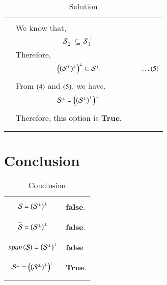 \documentclass[journal,12pt]{IEEEtran}
\begin{document}
\begin{longtable}{|c|l|}
	&\\
	&We know that,\\
	&$\qquad\qquad\qquad\mathcal{S}_{2}^{\perp}\subseteq\mathcal{S}_{1}^{\perp}$\\
	&Therefore,\\
	&$\qquad\qquad\qquad\left(\left(\mathcal{S}^{\perp}\right)^{\perp}\right)^{\perp}\subseteq\mathcal{S}^{\perp}\qquad\qquad\qquad\dots\left(5\right)$\\
	&\\
	&From $\left(4\right)$ and $\left(5\right)$, we have,\\
	&$\qquad\qquad\qquad\mathcal{S}^{\perp}=\left(\left(\mathcal{S}^{\perp}\right)^{\perp}\right)^{\perp}$\\
	&\\
	&Therefore, this option is \textbf{True}.\\
	&\\
	\hline
	\caption{Solution}
    \label{table:2}
\end{longtable}
\newpage
\section{\textbf{Conclusion}}
\renewcommand{\thetable}{2}
\begin{longtable}{|c|l|}
    \hline
	\multirow{3}{*}{$\mathcal{S}=\left(\mathcal{S}^{\perp}\right)^{\perp}$} 
	& \\
	&\textbf{false}.\\
	&\\
	\hline
    \multirow{3}{*}{$\overline{\mathcal{S}}=\left(\mathcal{S}^{\perp}\right)^{\perp}$} 
	& \\
	&\textbf{false}.\\
	&\\
	\hline
	\multirow{3}{*}{$\overline{span\left(\mathcal{S}\right)}=\left(\mathcal{S}^{\perp}\right)^{\perp}$}
	&\\
	&\textbf{false}\\
	&\\
	\hline
	\multirow{3}{*}{$\mathcal{S}^{\perp}=\left(\left(\mathcal{S}^{\perp}\right)^{\perp}\right)^{\perp}$}
	& \\
    &\textbf{True}.\\
	&\\
	\hline
	\caption{Conclusion}
    \label{table:3}
\end{longtable}
\end{document}
